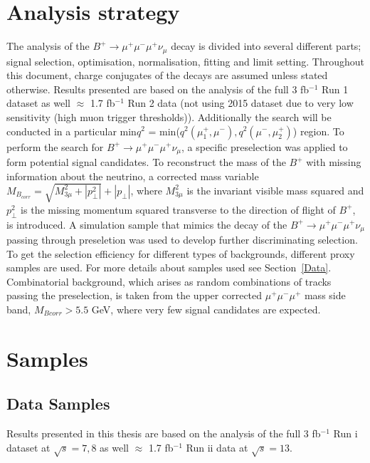 \section{Analysis strategy }%
\label{Strategy}

The analysis of the $B^{+} \rightarrow \mu^{+} \mu^{-} \mu^{+} \nu_\mu$ decay is divided into several different parts; signal selection, optimisation, normalisation, fitting and limit setting. Throughout this document, charge conjugates of the decays are assumed unless stated otherwise. Results presented are based on the analysis of the full 3 fb$^{-1}$ Run 1 dataset as well $\approx$ 1.7 fb$^{-1}$ Run 2 data (not using 2015 dataset due to very low sensitivity (high muon trigger thresholds)). Additionally the search will be conducted in a particular min$q^{2}$ = min($q^{2}(\mu_{1}^{+},\mu^{-}), q^2(\mu^{-},\mu_{2}^{+})$) region.
\newline To perform the search for $B^{+} \rightarrow \mu^{+} \mu^{-} \mu^{+} \nu_\mu$, a specific preselection was applied to form potential signal candidates. To reconstruct the mass of the $B^{+}$ with missing information about the neutrino, a corrected mass variable $M_{B_{corr}} = \sqrt{M_{3\mu}^{2} + |p^{2}_{\perp}|} + |p_{\perp}|$, where $M_{3\mu}^{2}$ is the invariant visible mass squared and $p^{2}_{\perp}$ is the missing momentum squared transverse to the direction of flight of $B^{+}$, is introduced. A simulation sample that mimics the decay of the $B^{+} \rightarrow \mu^{+} \mu^{-} \mu^{+} \nu_\mu$ passing through preseletion was used to develop further discriminating selection. To get the selection efficiency for different types of backgrounds, different proxy samples are used. For more details about samples used see Section~\ref{Data}.
\newline Combinatorial background, which arises as random combinations of tracks passing the preselection, is taken from the upper corrected $\mu^{+} \mu^{-} \mu^{+}$ mass side band, $M_{Bcorr} > 5.5$ GeV, where very few signal candidates are expected.


\section{Samples }
\subsection{Data Samples }
Results presented in this thesis are based on the analysis of the full 3 fb$^{-1}$ Run \Rn{1} dataset at $\sqrt{s}={7},{8}$ \tev as well $\approx$ 1.7 fb$^{-1}$ Run \Rn{2} data at $\sqrt{s}=13$\tev.

